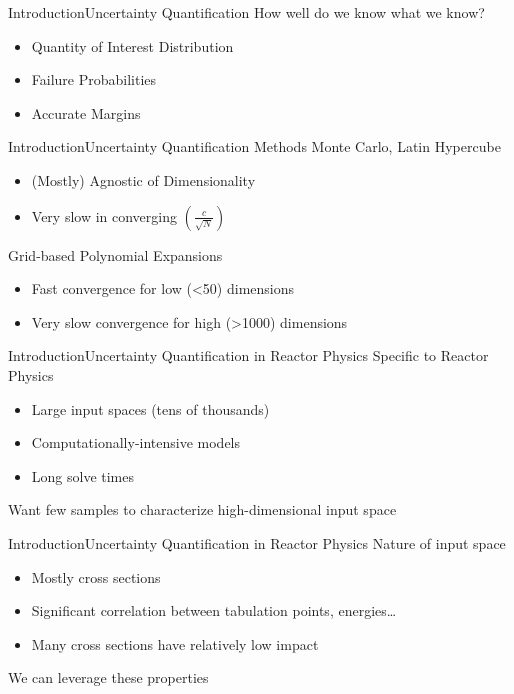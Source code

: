 \documentclass{beamer}
\begin{document}
\begin{frame}{Introduction}{Uncertainty Quantification}
  \vfill
  How well do we know what we know?
  \vfill
  \vspace{10pt}
  \begin{itemize}
    \item Quantity of Interest Distribution
  \vfill
    \item Failure Probabilities
  \vfill
    \item Accurate Margins
  \end{itemize}
  \vfill
\end{frame}
\begin{frame}{Introduction}{Uncertainty Quantification Methods}
  \vfill
  Monte Carlo, Latin Hypercube
  \vfill
  \begin{itemize}
    \item (Mostly) Agnostic of Dimensionality
  \vfill
    \item Very slow in converging $\left(\frac{c}{\sqrt{N}}\right)$
  \end{itemize}
  \vfill
  Grid-based Polynomial Expansions
  \vfill
  \begin{itemize}
    \item Fast convergence for low (<50) dimensions
  \vfill
    \item Very slow convergence for high (>1000) dimensions
  \end{itemize}
  \vfill
\end{frame}
\begin{frame}{Introduction}{Uncertainty Quantification in Reactor Physics}
  \vfill
  Specific to Reactor Physics
  \vfill
  \begin{itemize}
    \item Large input spaces (tens of thousands)
  \vfill
    \item Computationally-intensive models
  \vfill
    \item Long solve times
  \end{itemize}
  \vfill
  Want few samples to characterize high-dimensional input space
  \vfill
\end{frame}
\begin{frame}{Introduction}{Uncertainty Quantification in Reactor Physics}
  \vfill
  Nature of input space
  \vfill
  \begin{itemize}
    \item Mostly cross sections
  \vfill
    \item Significant correlation between tabulation points, energies\dots
  \vfill
    \item Many cross sections have relatively low impact
  \end{itemize}
  \vfill
  We can leverage these properties
  \vfill
\end{frame}
\end{document}
